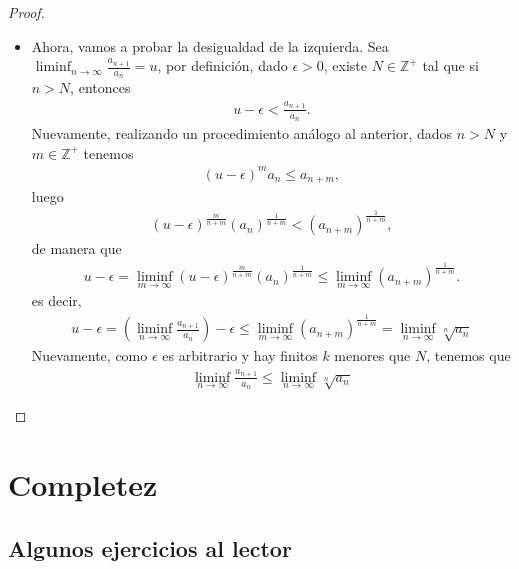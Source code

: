 \begin{itemize}[leftmargin=*]
\begin{proof}
\begin{itemize}
            \item Ahora, vamos a probar la desigualdad de la izquierda. Sea $\displaystyle\liminf_{n\to \infty}\frac{a_{n+1}}{a_n}=u$, por definición, dado $\epsilon>0$, existe $N\in \mathbb{Z}^+$ tal que si $n>N$, entonces
            \begin{align*}
                u-\epsilon<\frac{a_{n+1}}{a_n}.
            \end{align*}
            Nuevamente, realizando un procedimiento análogo al anterior, dados $n>N$ y $m \in \mathbb{Z^+}$ tenemos
            \begin{align*}
                (u-\epsilon)^ma_n\leq a_{n+m},
            \end{align*}
            luego
            \begin{align*}
                (u-\epsilon)^{\frac{m}{n+m}}(a_n)^{\frac{1}{n+m}}<(a_{n+m})^{\frac{1}{n+m}},
            \end{align*}
            de manera que
            \begin{align*}
                u-\epsilon=\liminf_{m\to \infty}(u-\epsilon)^{\frac{m}{n+m}}(a_n)^{\frac{1}{n+m}}\leq \liminf_{m\to \infty}(a_{n+m})^{\frac{1}{n+m}}.
            \end{align*}
            es decir,
            \begin{align*}
                u-\epsilon=\left(\liminf_{n\to \infty} \frac{a_{n+1}}{a_n}\right)-\epsilon\leq \liminf_{m\to \infty}(a_{n+m})^{\frac{1}{n+m}}=\liminf_{n\to \infty}\sqrt[n]{a_n}
            \end{align*}
            Nuevamente, como $\epsilon$ es arbitrario y hay finitos $k$ menores que $N$, tenemos que
            \begin{align*}
                \liminf_{n\to \infty} \frac{a_{n+1}}{a_n}\leq \liminf_{n\to \infty}\sqrt[n]{a_n}
            \end{align*}
    \end{itemize}
    

\end{proof}


\end{itemize}


\section{Completez}

\subsection{Algunos ejercicios al lector}

